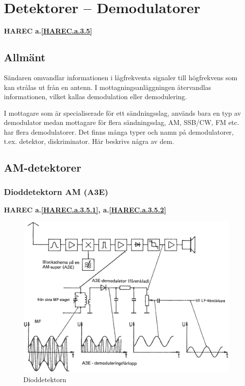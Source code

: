 \section{Detektorer -- Demodulatorer}
\textbf{HAREC a.\ref{HAREC.a.3.5}\label{myHAREC.a.3.5}}

\subsection{Allmänt}

Sändaren omvandlar informationen i lågfrekventa signaler till
högfrekvens som kan strålas ut från en antenn. I
mottagningsanläggningen återvandlas informationen, vilket kallas
demodulation eller demodulering.

I mottagare som är specialiserade för ett sändningsslag, används bara
en typ av demodulator medan mottagare för flera sändningsslag, AM,
SSB/CW, FM etc. har flera demodulatorer. Det finns många typer och
namn på demodulatorer, t.ex. detektor, diskriminator. Här beskrivs
några av dem.

\subsection{AM-detektorer}

\subsubsection{Dioddetektorn AM (A3E)}
\textbf{HAREC
  a.\ref{HAREC.a.3.5.1}\label{myHAREC.a.3.5.1},
  a.\ref{HAREC.a.3.5.2}\label{myHAREC.a.3.5.2}
}

\begin{figure}
\includegraphics[width=\textwidth]{images/cropped_pdfs/bild_2_3-55.pdf}
\caption{Dioddetektorn}
\label{fig:BildII3-55}
\end{figure}

